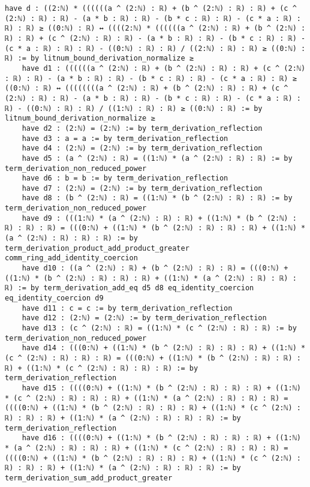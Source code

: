\documentclass{article}
\begin{document}
\begin{tcolorbox}[colback=white!10, width=\linewidth]
\begin{lstlisting}[language=Lean4]
    have d : ((2:ℕ) * ((((((a ^ (2:ℕ) : ℝ) + (b ^ (2:ℕ) : ℝ) : ℝ) + (c ^ (2:ℕ) : ℝ) : ℝ) - (a * b : ℝ) : ℝ) - (b * c : ℝ) : ℝ) - (c * a : ℝ) : ℝ) : ℝ) ≥ ((0:ℕ) : ℝ) ↔ ((((2:ℕ) * ((((((a ^ (2:ℕ) : ℝ) + (b ^ (2:ℕ) : ℝ) : ℝ) + (c ^ (2:ℕ) : ℝ) : ℝ) - (a * b : ℝ) : ℝ) - (b * c : ℝ) : ℝ) - (c * a : ℝ) : ℝ) : ℝ) - ((0:ℕ) : ℝ) : ℝ) / ((2:ℕ) : ℝ) : ℝ) ≥ ((0:ℕ) : ℝ) := by litnum_bound_derivation_normalize ≥
    have d1 : ((((((a ^ (2:ℕ) : ℝ) + (b ^ (2:ℕ) : ℝ) : ℝ) + (c ^ (2:ℕ) : ℝ) : ℝ) - (a * b : ℝ) : ℝ) - (b * c : ℝ) : ℝ) - (c * a : ℝ) : ℝ) ≥ ((0:ℕ) : ℝ) ↔ ((((((((a ^ (2:ℕ) : ℝ) + (b ^ (2:ℕ) : ℝ) : ℝ) + (c ^ (2:ℕ) : ℝ) : ℝ) - (a * b : ℝ) : ℝ) - (b * c : ℝ) : ℝ) - (c * a : ℝ) : ℝ) - ((0:ℕ) : ℝ) : ℝ) / ((1:ℕ) : ℝ) : ℝ) ≥ ((0:ℕ) : ℝ) := by litnum_bound_derivation_normalize ≥
    have d2 : (2:ℕ) = (2:ℕ) := by term_derivation_reflection
    have d3 : a = a := by term_derivation_reflection
    have d4 : (2:ℕ) = (2:ℕ) := by term_derivation_reflection
    have d5 : (a ^ (2:ℕ) : ℝ) = ((1:ℕ) * (a ^ (2:ℕ) : ℝ) : ℝ) := by term_derivation_non_reduced_power
    have d6 : b = b := by term_derivation_reflection
    have d7 : (2:ℕ) = (2:ℕ) := by term_derivation_reflection
    have d8 : (b ^ (2:ℕ) : ℝ) = ((1:ℕ) * (b ^ (2:ℕ) : ℝ) : ℝ) := by term_derivation_non_reduced_power
    have d9 : (((1:ℕ) * (a ^ (2:ℕ) : ℝ) : ℝ) + ((1:ℕ) * (b ^ (2:ℕ) : ℝ) : ℝ) : ℝ) = (((0:ℕ) + ((1:ℕ) * (b ^ (2:ℕ) : ℝ) : ℝ) : ℝ) + ((1:ℕ) * (a ^ (2:ℕ) : ℝ) : ℝ) : ℝ) := by term_derivation_product_add_product_greater comm_ring_add_identity_coercion
    have d10 : ((a ^ (2:ℕ) : ℝ) + (b ^ (2:ℕ) : ℝ) : ℝ) = (((0:ℕ) + ((1:ℕ) * (b ^ (2:ℕ) : ℝ) : ℝ) : ℝ) + ((1:ℕ) * (a ^ (2:ℕ) : ℝ) : ℝ) : ℝ) := by term_derivation_add_eq d5 d8 eq_identity_coercion eq_identity_coercion d9
    have d11 : c = c := by term_derivation_reflection
    have d12 : (2:ℕ) = (2:ℕ) := by term_derivation_reflection
    have d13 : (c ^ (2:ℕ) : ℝ) = ((1:ℕ) * (c ^ (2:ℕ) : ℝ) : ℝ) := by term_derivation_non_reduced_power
    have d14 : (((0:ℕ) + ((1:ℕ) * (b ^ (2:ℕ) : ℝ) : ℝ) : ℝ) + ((1:ℕ) * (c ^ (2:ℕ) : ℝ) : ℝ) : ℝ) = (((0:ℕ) + ((1:ℕ) * (b ^ (2:ℕ) : ℝ) : ℝ) : ℝ) + ((1:ℕ) * (c ^ (2:ℕ) : ℝ) : ℝ) : ℝ) := by term_derivation_reflection
    have d15 : ((((0:ℕ) + ((1:ℕ) * (b ^ (2:ℕ) : ℝ) : ℝ) : ℝ) + ((1:ℕ) * (c ^ (2:ℕ) : ℝ) : ℝ) : ℝ) + ((1:ℕ) * (a ^ (2:ℕ) : ℝ) : ℝ) : ℝ) = ((((0:ℕ) + ((1:ℕ) * (b ^ (2:ℕ) : ℝ) : ℝ) : ℝ) + ((1:ℕ) * (c ^ (2:ℕ) : ℝ) : ℝ) : ℝ) + ((1:ℕ) * (a ^ (2:ℕ) : ℝ) : ℝ) : ℝ) := by term_derivation_reflection
    have d16 : ((((0:ℕ) + ((1:ℕ) * (b ^ (2:ℕ) : ℝ) : ℝ) : ℝ) + ((1:ℕ) * (a ^ (2:ℕ) : ℝ) : ℝ) : ℝ) + ((1:ℕ) * (c ^ (2:ℕ) : ℝ) : ℝ) : ℝ) = ((((0:ℕ) + ((1:ℕ) * (b ^ (2:ℕ) : ℝ) : ℝ) : ℝ) + ((1:ℕ) * (c ^ (2:ℕ) : ℝ) : ℝ) : ℝ) + ((1:ℕ) * (a ^ (2:ℕ) : ℝ) : ℝ) : ℝ) := by term_derivation_sum_add_product_greater

\end{lstlisting}
\end{tcolorbox}
\end{document}
